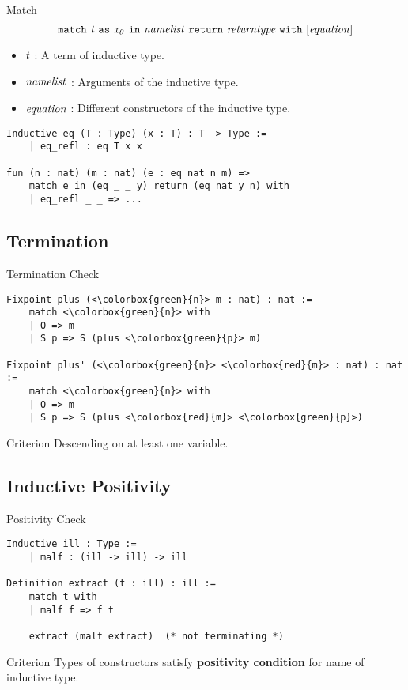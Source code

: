 \documentclass[UTF-8]{beamer}
\begin{document}
\begin{frame}[fragile]{Match}
$$\tt match\ {\it t}\ as\ {\it x_0}\ in\ {\it namelist}\ return\ {\it returntype}\ with\ [{\it equation}]$$
\begin{itemize}
    \item $\it t$ : A term of inductive type.
    \item $\it namelist$ : Arguments of the inductive type.
    \item $\it equation$ : Different constructors of the inductive type.
\end{itemize}

\begin{verbatim}
Inductive eq (T : Type) (x : T) : T -> Type :=
    | eq_refl : eq T x x

fun (n : nat) (m : nat) (e : eq nat n m) =>
    match e in (eq _ _ y) return (eq nat y n) with
    | eq_refl _ _ => ...
\end{verbatim}
\end{frame}

\subsection{Termination}
\begin{frame}[fragile]{Termination Check}
\begin{verbatim}
Fixpoint plus (<\colorbox{green}{n}> m : nat) : nat :=
    match <\colorbox{green}{n}> with
    | O => m
    | S p => S (plus <\colorbox{green}{p}> m)

Fixpoint plus' (<\colorbox{green}{n}> <\colorbox{red}{m}> : nat) : nat :=
    match <\colorbox{green}{n}> with
    | O => m
    | S p => S (plus <\colorbox{red}{m}> <\colorbox{green}{p}>)
\end{verbatim}
\begin{alertblock}{Criterion}
    Descending on at least one variable.
\end{alertblock}
\end{frame}

\subsection{Inductive Positivity}
\begin{frame}[fragile]{Positivity Check}
\begin{verbatim}
Inductive ill : Type :=
    | malf : (ill -> ill) -> ill 

Definition extract (t : ill) : ill :=
    match t with
    | malf f => f t

    extract (malf extract)  (* not terminating *)
\end{verbatim}
\begin{alertblock}{Criterion}
    Types of constructors satisfy \textbf{positivity condition} for name of inductive type.
\end{alertblock}
\end{frame}
\end{document}
